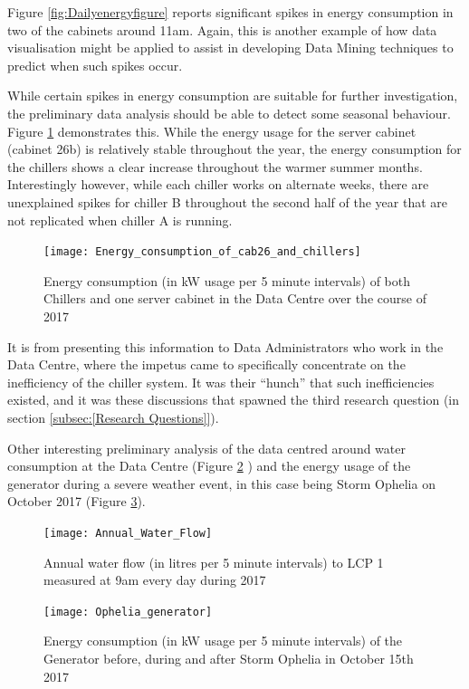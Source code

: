 \documentclass[12pt]{scrartcl}
\begin{document}
Figure \ref{fig:Dailyenergyfigure} reports significant spikes in energy consumption in two of the cabinets around 11am. Again, this is another example of how data visualisation might be applied to assist in developing Data Mining techniques to predict when such spikes occur. 

While certain spikes in energy consumption are suitable for further investigation, the preliminary data analysis should be able to detect some seasonal behaviour. Figure \ref{fig:cabvchillerfigure} demonstrates this. While the energy usage for the server cabinet (cabinet 26b) is relatively stable throughout the year, the energy consumption for the chillers shows a clear increase throughout the warmer summer months. Interestingly however, while each chiller works on alternate weeks, there are unexplained spikes for chiller B throughout the second half of the year that are not replicated when chiller A is running. 

\begin{figure}[H]
  \caption{Energy consumption (in kW usage per 5 minute intervals) of both Chillers and one server cabinet in the Data Centre over the course of 2017}
  \label{fig:cabvchillerfigure}
  \centering
    \texttt{[image: Energy\_consumption\_of\_cab26\_and\_chillers]}
\end{figure} 

It is from presenting this information to Data Administrators who work in the Data Centre, where the impetus came to specifically concentrate on the inefficiency of the chiller system. It was their ``hunch'' that such inefficiencies existed, and it was these discussions that spawned the third research question (in section \ref{subsec:[Research Questions]}).   

Other interesting preliminary analysis of the data centred around water consumption at the Data Centre (Figure \ref{fig:annualwaterfigure} ) and the energy usage of the generator during a severe weather event, in this case being Storm Ophelia on October 2017 (Figure \ref{fig:opheliafigure}). 

\begin{figure}[H]
  \caption{Annual water flow (in litres per 5 minute intervals) to LCP 1 measured at 9am every day during 2017}
  \label{fig:annualwaterfigure}
  \centering
    \texttt{[image: Annual\_Water\_Flow]}
\end{figure} 

\begin{figure}[H]
  \caption{Energy consumption (in kW usage per 5 minute intervals) of the Generator before, during and after Storm Ophelia in October 15th 2017}
  \label{fig:opheliafigure}
  \centering
    \texttt{[image: Ophelia\_generator]}
\end{figure} 
\end{document}
